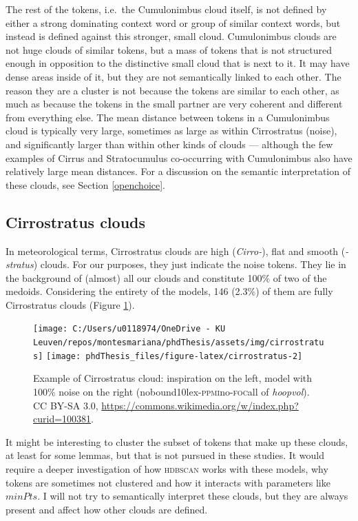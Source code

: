 \documentclass[
]{book}
\begin{document}
The rest of the tokens, i.e.~the Cumulonimbus cloud itself, is not defined by either a strong dominating context word or group of similar context words, but instead is defined against this stronger, small cloud. Cumulonimbus clouds are not huge clouds of similar tokens, but a mass of tokens that is not structured enough in opposition to the distinctive small cloud that is next to it. It may have dense areas inside of it, but they are not semantically linked to each other. The reason they are a cluster is not because the tokens are similar to each other, as much as because the tokens in the small partner are very coherent and different from everything else. The mean distance between tokens in a Cumulonimbus cloud is typically very large, sometimes as large as within Cirrostratus (noise), and significantly larger than within other kinds of clouds --- although the few examples of Cirrus and Stratocumulus co-occurring with Cumulonimbus also have relatively large mean distances.
For a discussion on the semantic interpretation of these clouds, see Section \ref{openchoice}.

\hypertarget{cirrostratus-clouds}{%
\subsection{Cirrostratus clouds}\label{cirrostratus-clouds}}

In meteorological terms, Cirrostratus clouds are high (\emph{Cirro-}), flat and smooth (\emph{-stratus}) clouds. For our purposes, they just indicate the noise tokens. They lie in the background of (almost) all our clouds and constitute 100\% of two of the medoids. Considering the entirety of the models, 146 (2.3\%) of them are fully Cirrostratus clouds (Figure \ref{fig:cirrostratus}).



\begin{figure}
\texttt{[image: C:/Users/u0118974/OneDrive - KU Leuven/repos/montesmariana/phdThesis/assets/img/cirrostratus]} \texttt{[image: phdThesis\_files/figure-latex/cirrostratus-2]} \caption{Example of Cirrostratus cloud: inspiration on the left, model with 100\% noise on the right (nobound10lex-\textsc{ppmi}no-\textsc{foc}all of \emph{hoopvol}). CC BY-SA 3.0, \url{https://commons.wikimedia.org/w/index.php?curid=100381}.}\label{fig:cirrostratus}
\end{figure}

It might be interesting to cluster the subset of tokens that make up these clouds, at least for some lemmas, but that is not pursued in these studies. It would require a deeper investigation of how \textsc{hdbscan} works with these models, why tokens are sometimes not clustered and how it interacts with parameters like \(minPts\). I will not try to semantically interpret these clouds, but they are always present and affect how other clouds are defined.
\end{document}

